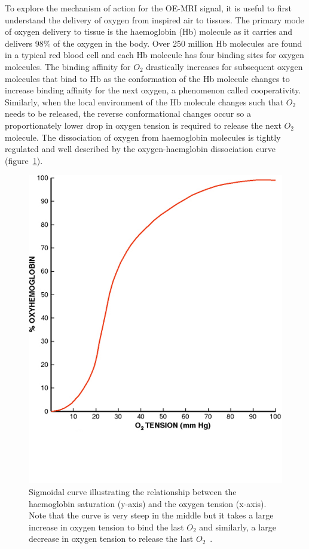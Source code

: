 To explore the mechanism of action for the OE-MRI signal, it is useful to first understand the delivery of oxygen from inspired air to tissues. 
The primary mode of oxygen delivery to tissue is the haemoglobin (Hb) molecule as it carries and delivers 98\% of the oxygen in the body. 
Over 250 million Hb molecules are found in a typical red blood cell and each Hb molecule has four binding sites for oxygen molecules. 
The binding affinity for ${O_2}$ drastically increases for subsequent oxygen molecules that bind to Hb as the conformation of the Hb molecule changes to increase binding affinity for the next oxygen, a phenomenon called cooperativity. 
Similarly, when the local environment of the Hb molecule changes such that ${O_2}$ needs to be released, the reverse conformational changes occur so a proportionately lower drop in oxygen tension is required to release the next ${O_2}$ molecule. 
The dissociation of oxygen from haemoglobin molecules is tightly regulated and well described by the oxygen-haemglobin dissociation curve (figure~\ref{HBdis}).

	\begin{figure}
		\begin{center}
		\includegraphics[width=\textwidth]{./intro/intro-images/HBdis.png}
		\caption{Sigmoidal curve illustrating the relationship between the haemoglobin saturation (y-axis) and the oxygen tension (x-axis). Note that the curve is very steep in the middle but it takes a large increase in oxygen tension to bind the last ${O_2}$ and similarly, a large decrease in oxygen tension to release the last  ${O_2}$~\cite{GomezCambronero:2001hu}.}
		\label{HBdis}
		\end{center}
	\end{figure}	

